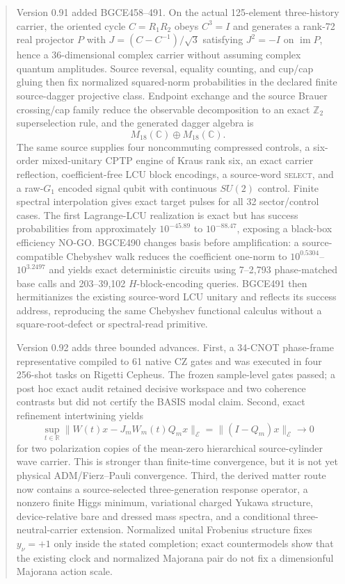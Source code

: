 \documentclass[11pt]{article}
\theoremstyle{definition}
\theoremstyle{remark}
\begin{document}
\begin{abstract}
Version 0.91 added BGCE458--491. On the actual 125-element three-history carrier, the oriented cycle $C=R_1R_2$ obeys $C^3=I$ and generates a rank-72 real projector $P$ with $J=(C-C^{-1})/\sqrt3$ satisfying $J^2=-I$ on $\operatorname{im}P$, hence a 36-dimensional complex carrier without assuming complex quantum amplitudes. Source reversal, equality counting, and cup/cap gluing then fix normalized squared-norm probabilities in the declared finite source-dagger projective class. Endpoint exchange and the source Brauer crossing/cap family reduce the observable decomposition to an exact $\mathbb Z_2$ superselection rule, and the generated dagger algebra is
\[
M_{18}(\mathbb C)\oplus M_{18}(\mathbb C).
\]
The same source supplies four noncommuting compressed controls, a six-order mixed-unitary CPTP engine of Kraus rank six, an exact carrier reflection, coefficient-free LCU block encodings, a source-word \textsc{select}, and a raw-$G_1$ encoded signal qubit with continuous $SU(2)$ control. Finite spectral interpolation gives exact target pulses for all 32 sector/control cases. The first Lagrange-LCU realization is exact but has success probabilities from approximately $10^{-45.89}$ to $10^{-88.47}$, exposing a black-box efficiency NO-GO. BGCE490 changes basis before amplification: a source-compatible Chebyshev walk reduces the coefficient one-norm to $10^{0.5304}$--$10^{3.2497}$ and yields exact deterministic circuits using 7--2,793 phase-matched base calls and 203--39,102 $H$-block-encoding queries. BGCE491 then hermitianizes the existing source-word LCU unitary and reflects its success address, reproducing the same Chebyshev functional calculus without a square-root-defect or spectral-read primitive.

Version 0.92 adds three bounded advances. First, a 34-CNOT phase-frame representative compiled to 61 native CZ gates and was executed in four 256-shot tasks on Rigetti Cepheus. The frozen sample-level gates passed; a post hoc exact audit retained decisive workspace and two coherence contrasts but did not certify the BASIS modal claim. Second, exact refinement intertwining yields
\[
 \sup_{t\in\mathbb R}\lVert W(t)x-J_mW_m(t)Q_mx\rVert_{\mathcal E}
 =\lVert(I-Q_m)x\rVert_{\mathcal E}\longrightarrow0
\]
for two polarization copies of the mean-zero hierarchical source-cylinder wave carrier. This is stronger than finite-time convergence, but it is not yet physical ADM/Fierz--Pauli convergence. Third, the derived matter route now contains a source-selected three-generation response operator, a nonzero finite Higgs minimum, variational charged Yukawa structure, device-relative bare and dressed mass spectra, and a conditional three-neutral-carrier extension. Normalized unital Frobenius structure fixes $y_\nu=+1$ only inside the stated completion; exact countermodels show that the existing clock and normalized Majorana pair do not fix a dimensionful Majorana action scale.


\end{abstract}
\end{document}
